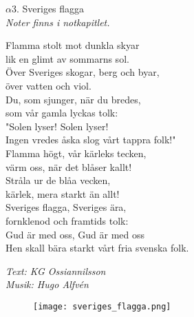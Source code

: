 \documentclass[a6paper,10pt]{article}
\newcommand{\auth}[1]{\begin{flushright}\textit{#1}\end{flushright}}
\newcommand{\songtitle}[2]{\Large{#1. #2}\\}
\newcommand{\sheetmusicnotice}[1]{\small{\textit{#1}}}
\newenvironment{lyrics}{}{} %
\begin{document}
\setlength{\oddsidemargin}{-0.37in}
\begin{center}
\songtitle{$\alpha3$}{Sveriges flagga}
\sheetmusicnotice{Noter finns i notkapitlet.}
\end{center}
\begin{lyrics}
Flamma stolt mot dunkla skyar\\
lik en glimt av sommarns sol.\\
Över Sveriges skogar, berg och byar,\\
över vatten och viol.\\
Du, som sjunger, när du bredes,\\
som vår gamla lyckas tolk:\\
"Solen lyser! Solen lyser!\\
Ingen vredes åska slog vårt tappra folk!"
\vspace{5pt}\\
Flamma högt, vår kärleks tecken,\\
värm oss, när det blåser kallt!\\
Stråla ur de blåa vecken,\\
kärlek, mera starkt än allt!\\
Sveriges flagga, Sveriges ära,\\
fornklenod och framtids tolk:\\
Gud är med oss, Gud är med oss\\
Hen skall bära starkt vårt fria svenska folk. 
\end{lyrics}
\auth{Text: KG Ossiannilsson\\Musik: Hugo Alfvén}
\vspace{20pt}
\begin{figure}[!h]
\centering
\texttt{[image: sveriges\_flagga.png]}
\end{figure}
\end{document}
